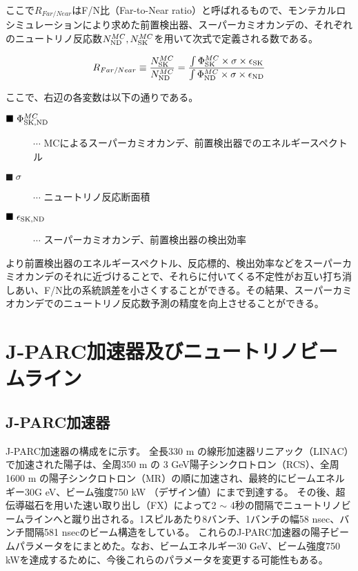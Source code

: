 ここで$R_{Far/Near}$はF/N比（Far-to-Near ratio）と呼ばれるもので、モンテカルロシミュレーションにより求めた前置検出器、スーパーカミオカンデの、それぞれのニュートリノ反応数$N_{\mathrm{ND}}^{MC}, N_{\mathrm{SK}}^{MC}$を用いて次式で定義される数である。

\begin{equation}
R_{Far/Near} \equiv \frac{N_{\mathrm{SK}}^{MC}}{N_{\mathrm{ND}}^{MC}} = \frac{\int \Phi_{\mathrm{SK}}^{MC} \times \sigma \times \epsilon_{\mathrm{SK}}}{\int \Phi_{\mathrm{ND}}^{MC} \times \sigma \times \epsilon_{\mathrm{ND}}}
\label{FN}
\end{equation}

ここで、右辺の各変数は以下の通りである。
\begin{description}
\item [$\blacksquare\ \Phi_{\mathrm{SK}, \mathrm{ND}}^{MC}$] $\cdots$ MCによるスーパーカミオカンデ、前置検出器でのエネルギースペクトル
\item [$\blacksquare\ \sigma$] $\cdots$ ニュートリノ反応断面積
\item [$\blacksquare\ \epsilon_{\mathrm{SK}, \mathrm{ND}}$] $\cdots$ スーパーカミオカンデ、前置検出器の検出効率
\end{description}

より前置検出器のエネルギースペクトル、反応標的、検出効率などをスーパーカミオカンデのそれに近づけることで、それらに付いてくる不定性がお互い打ち消しあい、F/N比の系統誤差を小さくすることができる。その結果、スーパーカミオカンデでのニュートリノ反応数予測の精度を向上させることができる。



\section{J-PARC加速器及びニュートリノビームライン}

\subsection{J-PARC加速器}
J-PARC加速器の構成をに示す。
全長330 m の線形加速器リニアック（LINAC）で加速された陽子は、全周350 m の 3 GeV陽子シンクロトロン（RCS）、全周1600 m の陽子シンクロトロン（MR）の順に加速され、最終的にビームエネルギー30G eV、ビーム強度750 kW （デザイン値）にまで到達する。
その後、超伝導磁石を用いた速い取り出し（FX）によって2 $\sim$ 4秒の間隔でニュートリノビームラインへと蹴り出される。1スピルあたり8バンチ、1バンチの幅58 nsec、バンチ間隔581 nsecのビーム構造をしている。
これらのJ-PARC加速器の陽子ビームパラメータをにまとめた。なお、ビームエネルギー30 GeV、ビーム強度750 kWを達成するために、今後これらのパラメータを変更する可能性もある。

